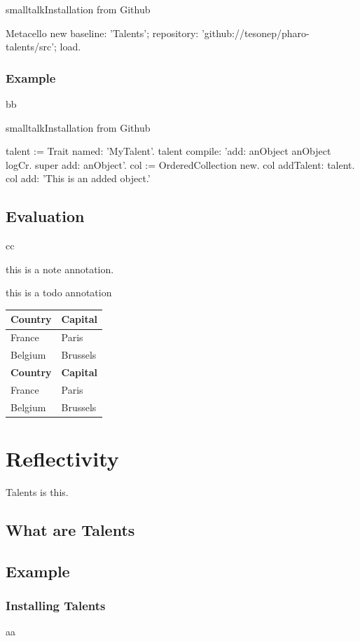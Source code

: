 \documentclass[10pt,twoside,english]{_support/latex/sbabook/sbabook}
\begin{document}
\begin{listing}[float, label=install]{smalltalk}{Installation from Github}

Metacello new
  baseline: 'Talents';
  repository: 'github://tesonep/pharo-talents/src';
  load.
\end{listing}
\subsection{Example}
bb

\begin{listing}[float, label=talent-example]{smalltalk}{Installation from Github}

talent := Trait named: 'MyTalent'.
talent compile: 'add: anObject
anObject logCr.
super add: anObject'.
col := OrderedCollection new.
col addTalent: talent.
col add: 'This is an added object.'
\end{listing}
\section{Evaluation}
cc

\begin{note}
this is a note annotation.
\end{note}

\begin{todo}
this is a todo annotation
\end{todo}

\begin{tabular}{ll}
\toprule
\textbf{Country} & \textbf{Capital} \\
\midrule
France & Paris \\
Belgium & Brussels \\
\textbf{Country} & \textbf{Capital} \\
\midrule
France & Paris \\
Belgium & Brussels \\
\bottomrule
\end{tabular}
\chapter{Reflectivity}
Talents \cite{ressia2014talents}is this.
\section{What are Talents}\section{Example}\subsection{Installing Talents}
aa
\end{document}
